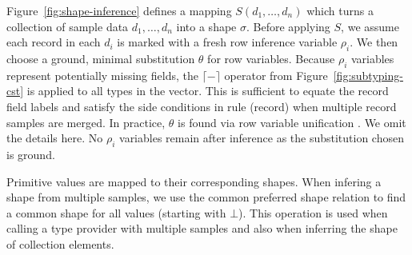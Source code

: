 \documentclass[10pt,preprint,clearpagebib]{sigplanconf}
\newcommand{\addopt}[1]{\lceil#1\rceil}
\newcommand{\semalt}[1]{S(#1)}
\begin{document}
Figure~\ref{fig:shape-inference} defines a mapping $\semalt{d_1,\ldots,d_n}$ which turns a collection of sample 
data $d_1, \ldots, d_n$ into a shape $\sigma$. Before applying $S$, we assume each record in each $d_i$ is marked with a fresh row inference
variable $\rho_i$.  
We then choose a ground, minimal substitution $\theta$ for row variables.
Because $\rho_i$ variables represent potentially missing fields,
the $\addopt{-}$ operator from Figure~\ref{fig:subtyping-cst} is applied to all types
in the vector. 
This is sufficient to equate the record field labels and satisfy the side conditions in rule (record) when multiple record samples are merged.
In practice, $\theta$ is found via row variable unification \cite{rows-remy}. We omit the details here.
No $\rho_i$ variables remain after inference as the substitution chosen is ground.

Primitive  values are mapped to their corresponding shapes. 
When infering a shape from multiple samples, we use the common preferred shape relation to find a 
common shape for all values (starting with $\bot$). This operation is used  
when calling a type provider with multiple samples and also when inferring the shape of collection
elements.

\end{document}
